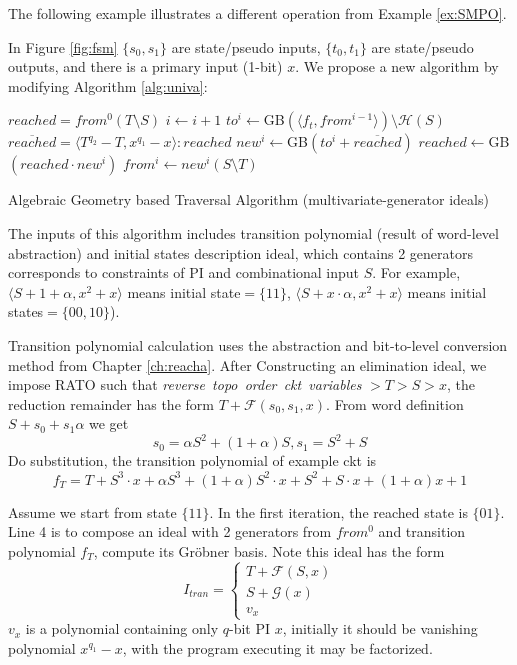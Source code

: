 The following example illustrates a different operation from Example \ref{ex:SMPO}.
\begin{Example}
In Figure \ref{fig:fsm}
$\{s_0, s_1\}$ are state/pseudo inputs, $\{t_0,t_1\}$ are state/pseudo outputs, and there is a primary input (1-bit) 
$x$. We propose a new algorithm by modifying Algorithm \ref{alg:univa}:

\IncMargin{1em}
\begin{algorithm}[hbt]
\SetAlgoNoLine
\LinesNumbered
  $reached = from^0(T\setminus S)$\;
  {
  	$i \gets i + 1$\;
	$to^i \gets$GB$(\langle f_t, from^{i-1}\rangle) \setminus \mathcal H(S)$\;
	$\overline{reached} = \langle T^{q_2}-T, x^{q_1} - x \rangle : reached$\;
	$new^i \gets $GB$(to^i + \overline{reached})$\;
  	$reached \gets $GB$( reached \cdot new^i)$\;
	$from^i \gets new^i(S\setminus T)$\;
  }
\caption {Algebraic Geometry based Traversal Algorithm (multivariate-generator ideals)}\label{alg:multi}
\end{algorithm}
\DecMargin{1em}

The inputs of this algorithm includes transition polynomial (result of word-level abstraction) and initial 
states description ideal, which contains 2 generators corresponds to constraints of PI and combinational input $S$. 
For example, $\langle S+1+\alpha, x^2+x\rangle$ means initial state$=\{11\}$,
$\langle S+x\cdot\alpha, x^2+x\rangle$ means initial states$=\{00,10\}$).

Transition polynomial calculation uses the abstraction and bit-to-level conversion method from 
Chapter \ref{ch:reacha}. After Constructing
an elimination ideal, we impose RATO such that \emph{reverse\ topo\ order\ ckt\ variables }$> T > S > x$, the reduction
remainder has the form $T+\mathcal F(s_0,s_1,x)$. From word definition $S+s_0+s_1\alpha$ we get
$$s_0 = \alpha S^2+ (1+\alpha)S, s_1 = S^2+S$$
Do substitution, the transition polynomial of example ckt is 
$$f_T = T+S^3\cdot x+\alpha S^3+(1+\alpha)S^2\cdot x+S^2+S\cdot x+(1+\alpha)x+1$$

Assume we start from state $\{11\}$. In the first iteration, the reached state is $\{01\}$. Line 4 is to compose an
ideal with 2 generators from $from^0$ and transition polynomial $f_T$, compute its Gr\"obner basis. Note this ideal
has the form
\begin{equation}
I_{tran} = \left\{
             \begin{array}{c}
             T+\mathcal F(S,x) \\
             S + \mathcal G(x) \\
             v_x
             \end{array}  
        \right.
\end {equation}
$v_x$ is a polynomial containing only $q$-bit PI $x$, initially it should be vanishing polynomial $x^{q_1}-x$, 
with the program executing it may be factorized.


\end{Example}
